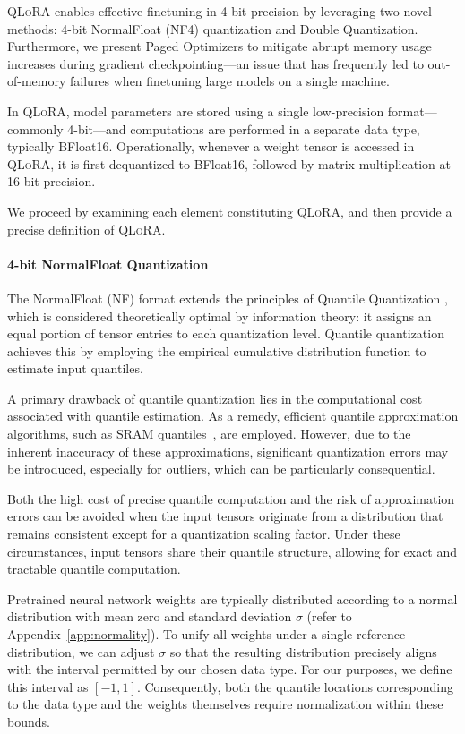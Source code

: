 \textsc{QLoRA} enables effective finetuning in 4-bit precision by leveraging two novel methods: 4-bit NormalFloat (NF4) quantization and Double Quantization. Furthermore, we present Paged Optimizers to mitigate abrupt memory usage increases during gradient checkpointing—an issue that has frequently led to out-of-memory failures when finetuning large models on a single machine.

In \textsc{QLoRA}, model parameters are stored using a single low-precision format—commonly 4-bit—and computations are performed in a separate data type, typically BFloat16. Operationally, whenever a weight tensor is accessed in \textsc{QLoRA}, it is first dequantized to BFloat16, followed by matrix multiplication at 16-bit precision.

We proceed by examining each element constituting \textsc{QLoRA}, and then provide a precise definition of \textsc{QLoRA}.

\paragraph{4-bit NormalFloat Quantization} The NormalFloat (NF) format extends the principles of Quantile Quantization \citep{dettmers2022optimizers}, which is considered theoretically optimal by information theory: it assigns an equal portion of tensor entries to each quantization level. Quantile quantization achieves this by employing the empirical cumulative distribution function to estimate input quantiles.

A primary drawback of quantile quantization lies in the computational cost associated with quantile estimation. As a remedy, efficient quantile approximation algorithms, such as SRAM quantiles~\citep{dettmers2022optimizers}, are employed. However, due to the inherent inaccuracy of these approximations, significant quantization errors may be introduced, especially for outliers, which can be particularly consequential.

Both the high cost of precise quantile computation and the risk of approximation errors can be avoided when the input tensors originate from a distribution that remains consistent except for a quantization scaling factor. Under these circumstances, input tensors share their quantile structure, allowing for exact and tractable quantile computation.

Pretrained neural network weights are typically distributed according to a normal distribution with mean zero and standard deviation $\sigma$ (refer to Appendix~\ref{app:normality}). To unify all weights under a single reference distribution, we can adjust $\sigma$ so that the resulting distribution precisely aligns with the interval permitted by our chosen data type. For our purposes, we define this interval as $[-1, 1]$. Consequently, both the quantile locations corresponding to the data type and the weights themselves require normalization within these bounds.

